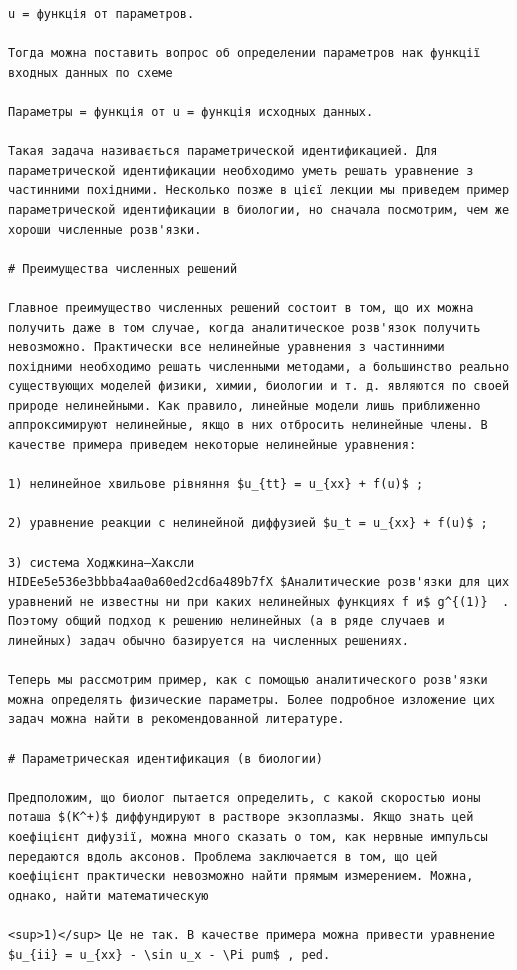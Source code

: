 \documentclass[
  ukrainian,
]{article}
\begin{document}
\begin{verbatim}
u = функція от параметров.

Тогда можна поставить вопрос об определении параметров нак функції входных данных по схеме

Параметры = функція от u = функція исходных данных.

Такая задача називається параметрической идентификацией. Для параметрической идентификации необходимо уметь решать уравнение з частинними похідними. Несколько позже в цієї лекции мы приведем пример параметрической идентификации в биологии, но сначала посмотрим, чем же хороши численные розв'язки.

# Преимущества численных решений

Главное преимущество численных решений состоит в том, що их можна получить даже в том случае, когда аналитическое розв'язок получить невозможно. Практически все нелинейные уравнения з частинними похідними необходимо решать численными методами, а большинство реально существующих моделей физики, химии, биологии и т. д. являются по своей природе нелинейными. Как правило, линейные модели лишь приближенно аппроксимируют нелинейные, якщо в них отбросить нелинейные члены. В качестве примера приведем некоторые нелинейные уравнения:

1) нелинейное хвильове рівняння $u_{tt} = u_{xx} + f(u)$ ;

2) уравнение реакции с нелинейной диффузией $u_t = u_{xx} + f(u)$ ;

3) система Ходжкина—Хаксли 
HIDEe5e536e3bbba4aa0a60ed2cd6a489b7fX $Аналитические розв'язки для цих уравнений не известны ни при каких нелинейных функциях f и$ g^{(1)}  . Поэтому общий подход к решению нелинейных (а в ряде случаев и линейных) задач обычно базируется на численных решениях.

Теперь мы рассмотрим пример, как с помощью аналитического розв'язки можна определять физические параметры. Более подробное изложение цих задач можна найти в рекомендованной литературе.

# Параметрическая идентификация (в биологии)

Предположим, що биолог пытается определить, с какой скоростью ионы поташа $(K^+)$ диффундируют в растворе экзоплазмы. Якщо знать цей коефіцієнт дифузії, можна много сказать о том, как нервные импульсы передаются вдоль аксонов. Проблема заключается в том, що цей коефіцієнт практически невозможно найти прямым измерением. Можна, однако, найти математическую

<sup>1)</sup> Це не так. В качестве примера можна привести уравнение $u_{ii} = u_{xx} - \sin u_x - \Pi pum$ , ped.


\end{verbatim}
\end{document}

